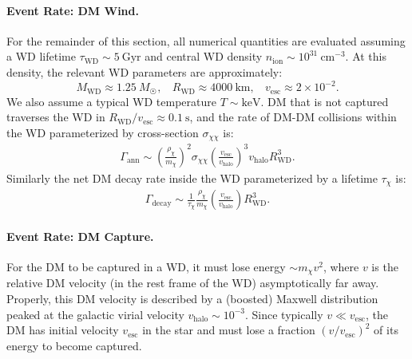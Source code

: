 \documentclass[preprintnumbers,amsmath,amssymb,prd,superscriptaddress]{revtex4}
\newcommand{\cm}{\text{cm}}
\def\r{\right)}
\def\l{\left(}
\begin{document}
\paragraph{Event Rate: DM Wind.}
For the remainder of this section, all numerical quantities are evaluated assuming a WD lifetime $\tau_\text{WD} \sim 5 ~\text{Gyr}$ and central WD density $n_\text{ion} \sim 10^{31} ~\cm^{-3}$. 
At this density, the relevant WD parameters are approximately: 
\begin{equation}
M_\text{WD} \approx 1.25 ~M_{\astrosun}, ~~~~ R_\text{WD} \approx 4000 ~\text{km}, ~~~~ v_\text{esc} \approx 2 \times 10^{-2}. 
\end{equation}
We also assume a typical WD temperature $T \sim \text{keV}$.
DM that is not captured traverses the WD in $R_\text{WD}/v_\text{esc} \approx 0.1 ~\text{s}$, and the rate of DM-DM collisions within the WD parameterized by cross-section $\sigma_{\chi \chi}$ is:
\begin{align}
  \Gamma_\text{ann}
  \sim \l \frac{\rho_\chi}{m_\chi} \r^2 \sigma_{\chi \chi} \l \frac{v_\text{esc}}{v_\text{halo}}\r^3 v_\text{halo} R_\text{WD}^3. 
  \label{eq:collisionDM}
\end{align}
Similarly the net DM decay rate inside the WD parameterized by a lifetime $\tau_\chi$ is:
\begin{align}
 \Gamma_\text{decay}
   \sim \frac{1}{\tau_\chi} \frac{\rho_{\chi}}{m_\chi} \l \frac{v_\text{esc}}{v_\text{halo}}\r R_\text{WD}^3.
  \label{eq:decayDM}
\end{align}

\paragraph{Event Rate: DM Capture.}
For the DM to be captured in a WD, it must lose energy $\sim m_\chi v^2$, where $v$ is the relative DM velocity (in the rest frame of the WD) asymptotically far away.
Properly, this DM velocity is described by a (boosted) Maxwell distribution peaked at the galactic virial velocity $v_\text{halo} \sim 10^{-3}$. 
Since typically $v \ll v_\text{esc}$, the DM has initial velocity $v_\text{esc}$ in the star and must lose a fraction $(v/v_\text{esc})^2$ of its energy to become captured. 
\end{document}
